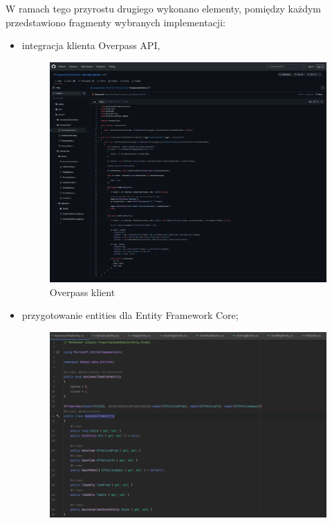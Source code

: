     W ramach tego przyrostu drugiego wykonano elementy, pomiędzy każdym przedstawiono fragmenty wybranych implementacji:
    \begin{itemize}
        \item integracja klienta Overpass API,
        \begin{figure}[H]
            \centering
            \includegraphics[width=1\textwidth]{attachments/overpassclient}
            \caption{Overpass klient}
            \label{fig:figure}
            \end{figure}
        \item przygotowanie entities dla Entity Framework Core;
        \begin{figure}[H]
            \centering
            \includegraphics[width=1\textwidth]{attachments/Entity}

\end{figure}
\end{itemize}
